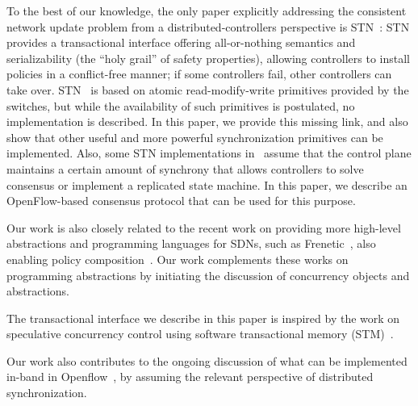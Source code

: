 \documentclass[conference]{sigcomm-alternate}
\begin{document}
To the best of our knowledge, the only paper explicitly addressing the consistent
network update problem from a distributed-controllers perspective is STN~\cite{stn}:
STN provides a transactional interface offering all-or-nothing semantics and serializability
(the ``holy grail'' of safety properties), allowing
controllers to install policies in a conflict-free manner; if some controllers fail,
other controllers can take over. STN~\cite{stn} is based on
atomic read-modify-write primitives provided by the switches, but
while the availability of such primitives is postulated, no implementation is
described. In this paper, we provide this missing link, and also show that other useful and
more powerful synchronization primitives can be implemented.
Also, some STN implementations in~\cite{stn} assume that the control
plane maintains a certain amount of synchrony that allows controllers
to solve consensus or implement a replicated state machine.
In this paper, we describe an OpenFlow-based consensus protocol that
can be used for this purpose.

Our work is also closely related to the recent work on providing more high-level
abstractions and programming languages for SDNs, such as Frenetic~\cite{frenetic},
also enabling policy composition~\cite{pyretic}. Our work complements these works
on programming abstractions
by initiating the discussion of concurrency objects and abstractions.

The transactional interface we describe in this paper is inspired by the
work on speculative concurrency control using software transactional memory
(STM)~\cite{stm-st95,tm-book}.

Our work also contributes to the ongoing discussion of what can be implemented
in-band in Openflow~\cite{compute,reclaim}, by assuming the relevant perspective of distributed
synchronization.
\end{document}
